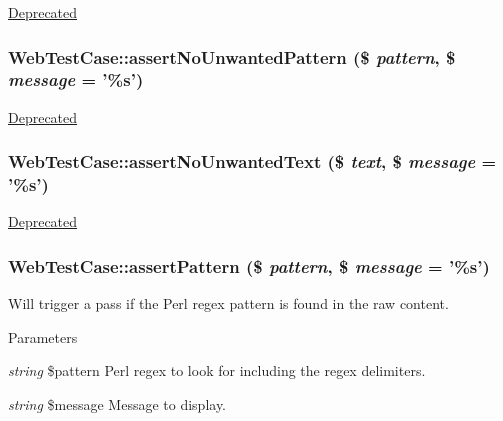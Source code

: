 \label{class_web_test_case_aa12793f1d62d25ae5748063e26a9a513}
\begin{Desc}
\item[\hyperlink{deprecated__deprecated000025}{Deprecated}]\end{Desc}
\hypertarget{class_web_test_case_a3bd8aaa61421d81544c32e617cddbcd1}{
\subsubsection[{assertNoUnwantedPattern}]{\setlength{\rightskip}{0pt plus 5cm}WebTestCase::assertNoUnwantedPattern (\$ {\em pattern}, \/  \$ {\em message} = {\ttfamily '\%s'})}}
\label{class_web_test_case_a3bd8aaa61421d81544c32e617cddbcd1}
\begin{Desc}
\item[\hyperlink{deprecated__deprecated000029}{Deprecated}]\end{Desc}
\hypertarget{class_web_test_case_ad05b092ba3b7e8f70c640504ec57538f}{
\subsubsection[{assertNoUnwantedText}]{\setlength{\rightskip}{0pt plus 5cm}WebTestCase::assertNoUnwantedText (\$ {\em text}, \/  \$ {\em message} = {\ttfamily '\%s'})}}
\label{class_web_test_case_ad05b092ba3b7e8f70c640504ec57538f}
\begin{Desc}
\item[\hyperlink{deprecated__deprecated000027}{Deprecated}]\end{Desc}
\hypertarget{class_web_test_case_afb9fdc739351627f08f50412a5313f0a}{
\subsubsection[{assertPattern}]{\setlength{\rightskip}{0pt plus 5cm}WebTestCase::assertPattern (\$ {\em pattern}, \/  \$ {\em message} = {\ttfamily '\%s'})}}
\label{class_web_test_case_afb9fdc739351627f08f50412a5313f0a}
Will trigger a pass if the Perl regex pattern is found in the raw content. 
\begin{DoxyParams}{Parameters}
\item[{\em string}]\$pattern Perl regex to look for including the regex delimiters. \item[{\em string}]\$message Message to display. \end{DoxyParams}
